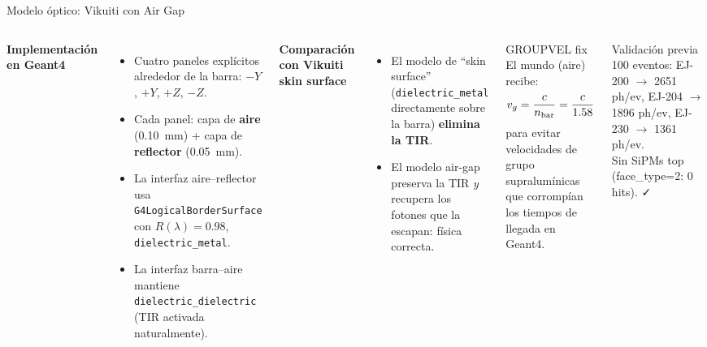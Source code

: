 \documentclass[aspectratio=169,9pt]{beamer}
\begin{document}
\begin{frame}{Modelo óptico: Vikuiti con Air Gap}
  \begin{columns}[T]
    \textbf{Implementación en Geant4}
    \begin{itemize}
      \item Cuatro paneles explícitos alrededor de la barra:
            $-Y$, $+Y$, $+Z$, $-Z$.
      \item Cada panel: capa de \textbf{aire} (\SI{0.10}{mm}) +
            capa de \textbf{reflector} (\SI{0.05}{mm}).
      \item La interfaz aire--reflector usa \texttt{G4LogicalBorderSurface}\\
            con $R(\lambda) = 0.98$, \texttt{dielectric\_metal}.
      \item La interfaz barra--aire mantiene \texttt{dielectric\_dielectric}
            (TIR activada naturalmente).
    \end{itemize}
    \vspace{0.4em}
    \textbf{Comparación con Vikuiti skin surface}
    \begin{itemize}
      \item El modelo de ``skin surface'' (\texttt{dielectric\_metal}
            directamente sobre la barra) \textbf{elimina la TIR}.
      \item El modelo air-gap preserva la TIR \textit{y} recupera los fotones
            que la escapan: física correcta.
    \end{itemize}

    \begin{block}{GROUPVEL fix}
      El mundo (aire) recibe:
      \begin{equation*}
        v_g = \frac{c}{n_{\rm bar}} = \frac{c}{1.58}
      \end{equation*}
      para evitar velocidades de grupo supralumínicas que corrompían
      los tiempos de llegada en Geant4.
    \end{block}
    \vspace{0.3em}
    \begin{alertblock}{Validación previa}
      100 eventos: EJ-200 $\to$ 2651 ph/ev,
      EJ-204 $\to$ 1896 ph/ev, EJ-230 $\to$ 1361 ph/ev.\\
      Sin SiPMs top (face\_type=2: 0 hits). ✓
    \end{alertblock}
  \end{columns}
\end{frame}
\end{document}
